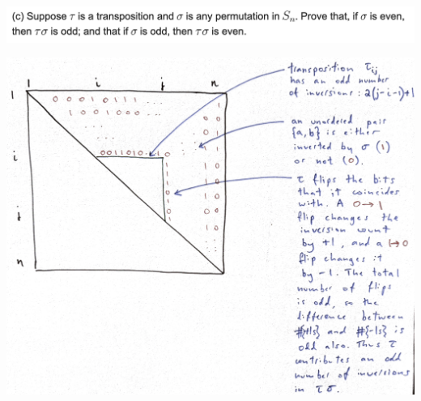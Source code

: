 \begin{mdframed}
\includegraphics[width=400pt]{img/algebra--nf--2-179c.png}
\end{mdframed}

\begin{mdframed}
\includegraphics[width=400pt]{img/abstract-algebra--nf--2-4dc0.png}
\end{mdframed}


